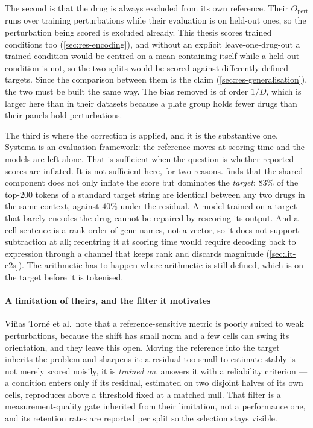 The second is that the drug is always excluded from its own reference. Their
$O_{\textrm{pert}}$ runs over training perturbations while their evaluation is on
held-out ones, so the perturbation being scored is excluded already. This thesis
scores trained conditions too (\cref{sec:res-encoding}), and without an explicit
leave-one-drug-out a trained condition would be centred on a mean containing
itself while a held-out condition is not, so the two splits would be scored
against differently defined targets. Since the comparison between them is the
claim (\cref{sec:res-generalisation}), the two must be built the same way. The
bias removed is of order $1/D$, which is larger here than in their datasets
because a plate group holds fewer drugs than their panels hold perturbations.

The third is where the correction is applied, and it is the substantive one.
Systema is an evaluation framework: the reference moves at scoring time and the
models are left alone. That is sufficient when the question is whether reported
scores are inflated. It is not sufficient here, for two reasons.
 finds that the shared component does not only inflate
the score but dominates the \emph{target}: $83\%$ of the top-$200$ tokens of a
standard target string are identical between any two drugs in the same context,
against $40\%$ under the residual. A model trained on a target that barely
encodes the drug cannot be repaired by rescoring its output. And a cell sentence
is a rank order of gene names, not a vector, so it does not support subtraction
at all; recentring it at scoring time would require decoding back to expression
through a channel that keeps rank and discards magnitude
(\cref{sec:lit-c2s}). The arithmetic has to happen where arithmetic is
still defined, which is on the target before it is tokenised. 

\paragraph{A limitation of theirs, and the filter it motivates} Vi\~nas Torn\'e
et al.\ note that a reference-sensitive metric is poorly suited to weak
perturbations, because the shift has small norm and a few cells can swing its
orientation, and they leave this open. Moving the reference into the target
inherits the problem and sharpens it: a residual too small to estimate stably is
not merely scored noisily, it is \emph{trained on}. 
answers it with a reliability criterion --- a condition enters only if its
residual, estimated on two disjoint halves of its own cells, reproduces above a
threshold fixed at a matched null. That filter is a measurement-quality gate
inherited from their limitation, not a performance one, and its retention rates
are reported per split so the selection stays visible.

